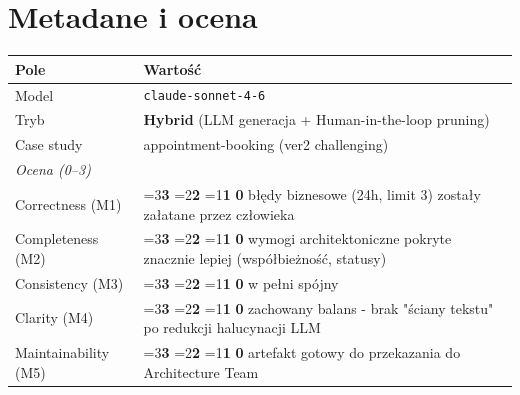 \documentclass[12pt,a4paper]{article}
\newcommand{\scorebox}[1]{%
  \ifnum#1=3\colorbox{score3}{\textbf{3}}%
  \else\ifnum#1=2\colorbox{score2}{\textbf{2}}%
  \else\ifnum#1=1\colorbox{score1}{\textbf{1}}%
  \else\colorbox{score0}{\textbf{0}}\fi\fi\fi
}
\begin{document}
\section{Metadane i ocena}
\begin{table}[h]
\begin{tabularx}{\textwidth}{l X}
\toprule
\textbf{Pole} & \textbf{Wartość} \\
\midrule
Model & \texttt{claude-sonnet-4-6} \\
Tryb & \textbf{Hybrid} (LLM generacja + Human-in-the-loop pruning) \\
Case study & appointment-booking (ver2 challenging) \\
\midrule
\multicolumn{2}{l}{\textit{Ocena (0--3)}} \\
\midrule
Correctness (M1)     & \scorebox{3} \quad błędy biznesowe (24h, limit 3) zostały załatane przez człowieka \\
Completeness (M2)    & \scorebox{3} \quad wymogi architektoniczne pokryte znacznie lepiej (współbieżność, statusy) \\
Consistency (M3)     & \scorebox{3} \quad w pełni spójny \\
Clarity (M4)         & \scorebox{3} \quad zachowany balans - brak "ściany tekstu" po redukcji halucynacji LLM \\
Maintainability (M5) & \scorebox{3} \quad artefakt gotowy do przekazania do Architecture Team \\
\bottomrule
\end{tabularx}
\end{table}
\end{document}
